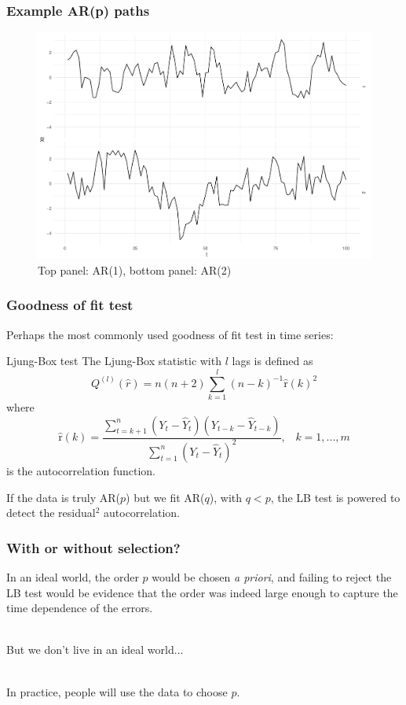 \documentclass{beamer}
\begin{document}
\begin{frame}
  \frametitle{Example AR(p) paths}
  \centering
  \begin{figure}
  \includegraphics[scale=0.4]{ar_paths.pdf}
  \caption{Top panel: AR(1), bottom panel: AR(2)}
  \end{figure}
\end{frame}


\begin{frame}
\frametitle{Goodness of fit test}
Perhaps the most commonly used goodness of fit test in time series:
\begin{block}{Ljung-Box test \cite{LBtest}}
The Ljung-Box statistic with $l$ lags is defined as
\begin{equation*}
Q^{(l)}(\widehat{r})=n(n+2)\sum_{k=1}^l(n-k)^{-1}\widehat{\mathrm{r}}(k)^2
\end{equation*}
where
\begin{equation*}
\widehat{\mathrm{r}}(k)=\dfrac{\sum_{t=k+1}^n(Y_t-\widehat{Y}_t)(Y_{t-k}-\widehat{Y}_{t-k})}{\sum_{t=1}^n(Y_t-\widehat{Y}_t)^2},\;\;\;k=1,...,m
\end{equation*}
is the autocorrelation function.
\end{block}

If the data is truly AR($p$) but we fit AR($q$), with $q < p$, the LB test is powered to detect the residual$^2$ autocorrelation.

\end{frame}

\begin{frame}
  \frametitle{With or without selection?}
  In an ideal world, the order $p$ would be chosen \textit{a priori}, and failing to reject the LB test would be evidence that the order was indeed large enough to capture the time dependence of the errors. \\

  \

  
  But we don't live in an ideal world... \\

  \ 
 
  In practice, people will use the data to choose $p$. \\
\end{frame}
\end{document}
